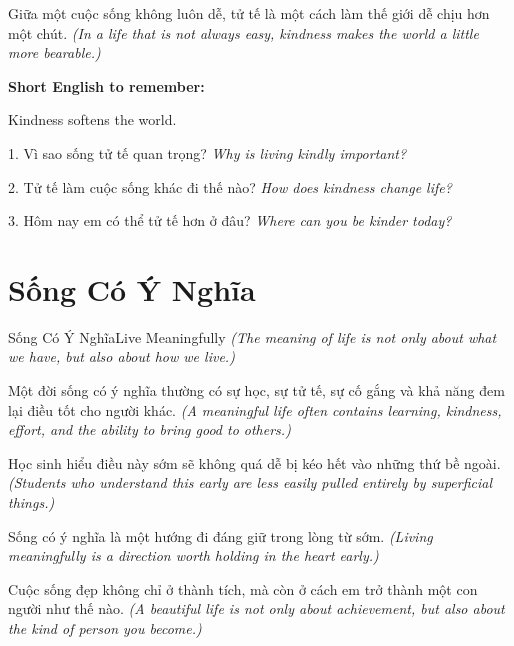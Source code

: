 \begin{baihoc}
Giữa một cuộc sống không luôn dễ, tử tế là một cách làm thế giới dễ chịu hơn một chút.
\textit{(In a life that is not always easy, kindness makes the world a little more bearable.)}
\end{baihoc}

\begin{ghinhoanh}
\textbf{Short English to remember:}

Kindness softens the world.

\end{ghinhoanh}

\begin{tuhocnhanh}
1. Vì sao sống tử tế quan trọng? \textit{Why is living kindly important?}

2. Tử tế làm cuộc sống khác đi thế nào? \textit{How does kindness change life?}

3. Hôm nay em có thể tử tế hơn ở đâu? \textit{Where can you be kinder today?}
\end{tuhocnhanh}
\ngancach

\section{Sống Có Ý Nghĩa}
\begin{truyen}{Sống Có Ý Nghĩa}{Live Meaningfully}
\textit{(The meaning of life is not only about what we have, but also about how we live.)}

Một đời sống có ý nghĩa thường có sự học, sự tử tế, sự cố gắng và khả năng đem lại điều tốt cho người khác.
\textit{(A meaningful life often contains learning, kindness, effort, and the ability to bring good to others.)}

Học sinh hiểu điều này sớm sẽ không quá dễ bị kéo hết vào những thứ bề ngoài.
\textit{(Students who understand this early are less easily pulled entirely by superficial things.)}

Sống có ý nghĩa là một hướng đi đáng giữ trong lòng từ sớm.
\textit{(Living meaningfully is a direction worth holding in the heart early.)}
\end{truyen}

\begin{baihoc}
Cuộc sống đẹp không chỉ ở thành tích, mà còn ở cách em trở thành một con người như thế nào.
\textit{(A beautiful life is not only about achievement, but also about the kind of person you become.)}
\end{baihoc}

